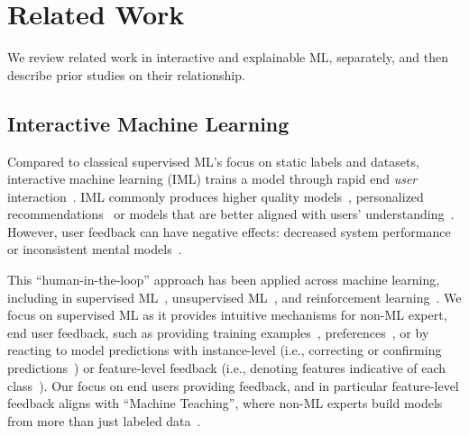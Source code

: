 \section{Related Work}
We review related work in interactive and explainable ML, separately, and then describe prior studies on their relationship. 

\subsection{Interactive Machine Learning}

Compared to classical supervised ML's focus on static labels and
datasets, interactive machine learning (IML) trains a model through rapid end \emph{user}
interaction~\cite{Amershi2014PowerLearning}.
%
IML commonly produces higher quality models~\cite{Settles2010ActiveSurvey, Raghavan2006ActiveInstances}, personalized recommendations~\cite{Amershi2012Regroup:Networks, Gowacka2013DirectingKeywords} or
models that are better aligned with users'
understanding~\cite{Hu2014InteractiveModeling,
Lee2012IVisClustering:Modeling}.
%
However, user feedback can have negative effects: decreased system 
performance~\cite{Ahn2007OpenHarm, Wu2019LocalAnalysis} or 
inconsistent mental models~\cite{Bansal2019UpdatesTradeoff}.

This ``human-in-the-loop'' approach has been applied across machine
learning, including in supervised
ML~\cite{Fails2003InteractiveLearning, Settles2010ActiveSurvey},
unsupervised ML~\cite{Balcan2008ClusteringFeedback}, and reinforcement
learning~\cite{Knox2012ReinforcementTasks,
Saunders2018TrialIntervention}.
%
We focus on supervised ML as it provides intuitive mechanisms for non-ML expert, end user
feedback, such as providing training
examples~\cite{Fiebrink2009ALearning},
preferences~\cite{Resnick1994GroupLens:Netnews}, or by
reacting to model predictions with instance-level (i.e., correcting or
confirming predictions~\cite{Fails2003InteractiveLearning,
Culotta2006CorrectiveExtraction}) or feature-level feedback (i.e.,
denoting features indicative of each
class~\cite{Settles2011ClosingInstances,
Kulesza2015PrinciplesLearning, Raghavan2006ActiveInstances}). Our focus on end users providing feedback, and in particular feature-level feedback aligns with ``Machine Teaching'', where non-ML experts build models from more than just labeled data~\cite{Wall2019UsingTeaching}.

%

